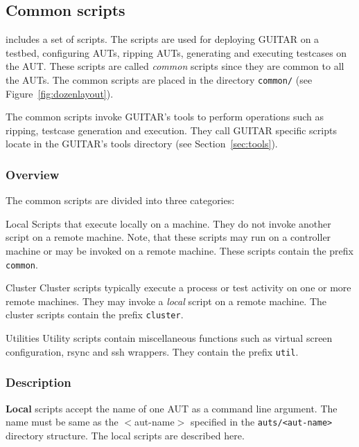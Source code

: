 %
%
\subsection{Common scripts}

\mddozen{} includes a set of scripts. The scripts are used for deploying GUITAR on a testbed, configuring AUTs, ripping AUTs, generating and executing testcases on the AUT. These scripts are called \textit{common} scripts since they are common to all the AUTs. The common scripts are placed in the directory \texttt{common/} (see Figure~\ref{fig:dozenlayout}).

The common scripts invoke GUITAR's tools to perform operations such as ripping, testcase generation and execution. They call GUITAR specific scripts locate in the GUITAR's tools directory (see Section~\ref{sec:tools}). 

\subsubsection{Overview}

The common scripts are divided into three categories:\\

\begin{smalldescription}
   \item [Local] Scripts that execute locally on a machine. They do not invoke another script on a remote machine. Note, that these scripts may run on a controller machine or may be invoked on a remote machine. These scripts contain the prefix \texttt{common}.

   \item [Cluster] Cluster scripts typically execute a process or test activity on one or more remote machines. They may invoke a \textit{local} script on a remote machine. The cluster scripts contain the prefix \texttt{cluster}.

   \item [Utilities] Utility scripts contain miscellaneous functions such as virtual screen configuration, rsync and ssh wrappers. They contain the prefix \texttt{util}.
\end{smalldescription}


\subsubsection{Description}

\textbf{Local} scripts accept the name of one AUT as a command line argument. The name must be same as the $<$aut-name$>$ specified in the \texttt{auts/<aut-name>} directory structure. The local scripts are described here.\\

